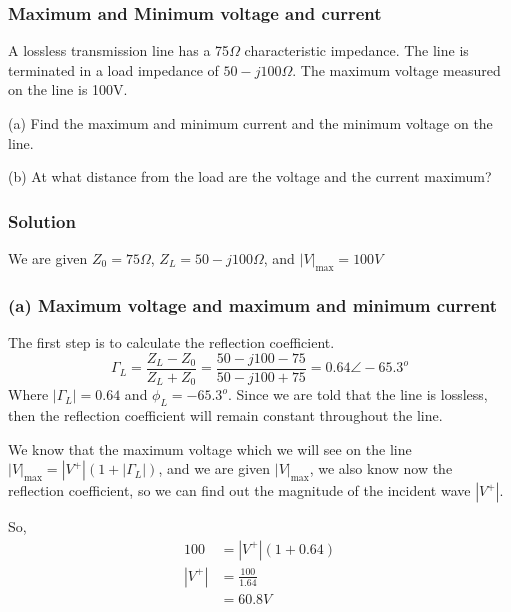 \begin{exmp}
\subsubsection*{Maximum and Minimum voltage and current}
A lossless transmission line has a 75$\Omega$ characteristic impedance. The line is terminated in a load impedance of $50-j100\Omega$. The maximum voltage measured on the line is 100V.

(a) Find the maximum and minimum current and the minimum voltage on the line.

(b) At what distance from the load are the voltage and the current maximum?

\subsubsection*{Solution}
We are given
$Z_{0}=75\Omega$,
$Z_{L}=50-j100\Omega$, and 
$|V|_\max=100V$

\subsubsection*{(a) Maximum voltage and maximum and minimum current}
The first step is to calculate the reflection coefficient.
\begin{dmath*}
\Gamma_{L}=\frac{Z_{L}-Z_{0}}{Z_{L}+Z_{0}}
=\frac{50-j100-75}{50-j100+75}
=0.64\angle-65.3^o 
\end{dmath*}
Where $|\Gamma_{L}|=0.64$ and $\phi_{L}=-65.3^o$. Since we are told that the line is lossless, then the reflection coefficient will remain constant throughout the line.

We know that the maximum voltage which we will see on the line $|V|_\max=|V^{+}|(1+|\Gamma_{L}|)$, and we are given $|V|_\max$, we also know now the reflection coefficient, so we can find out the magnitude of the incident wave $|V^+|$.

So,
\begin{align*}
100&=|V^{+}|(1+0.64)\\
|V^{+}|&=\frac{100}{1.64}\\
&=60.8V
\end{align*}


\end{exmp}
